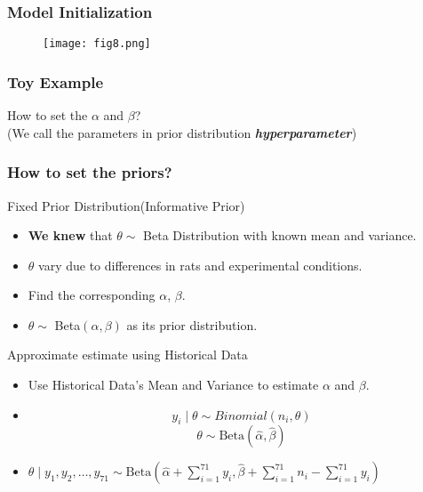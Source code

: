 \documentclass{beamer}
\begin{document}
\begin{frame}
\frametitle{Model Initialization}
\begin{figure}
\texttt{[image: fig8.png]}\\
\footnotesize{}
\end{figure}
\end{frame}


\begin{frame}
\frametitle{Toy Example}
How to set the $\alpha$ and $\beta$?\\ 
(We call the parameters in prior distribution {\bf \em hyperparameter})
\end{frame}


\begin{frame}
\frametitle{How to set the priors?}

\begin{block}{Fixed Prior Distribution(Informative Prior)}
\begin{itemize}
\item {\bf We knew} that $\theta \sim$ Beta Distribution with known mean and variance. 
\item $\theta$ vary due to differences in rats and experimental conditions. 
\item Find the corresponding $\alpha$, $\beta$. 
\item $\theta \sim$ Beta$(\alpha,\beta)$ as its prior distribution.
\end{itemize}
\end{block}

\begin{block}{Approximate estimate using Historical Data}
\begin{itemize}
\item Use Historical Data's Mean and Variance to estimate $\alpha$ and $\beta$. 
\item $$y_i \mid \theta \sim Binomial(n_i, \theta)$$
$$\theta \sim \text{Beta}(\hat{\alpha},\hat{\beta})$$
\item $\theta\mid y_1, y_2,\ldots,y_{71} \sim \text{Beta}(\hat{\alpha} + \sum_{i = 1}^{71} y_i ,\hat{\beta} + \sum_{i = 1}^{71}n_{i} -  \sum_{i = 1}^{71} y_i)$
\end{itemize}
\end{block}
\end{frame}
\end{document}
